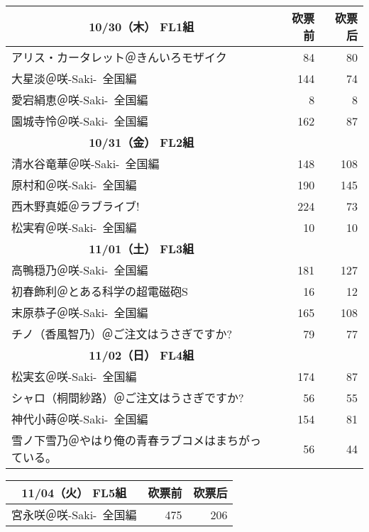 \documentclass[UTF8, punct=kaiming, zihao=-4]{ctexbook}
\newcommand{\kai}{\kaie\CJKfamily{kaiti}}
\newcommand{\mincho}{\minchoe\CJKfamily{mincho}}
\newcommand{\Saki}{咲-Saki-~全国編}
\newcommand{\Railgan}{とある科学の超電磁砲$\!$S}
\begin{document}
{\mincho{}
\begin{longtable}{|l|r|r|}\hline\hline
\multicolumn{1}{|c|}{\bf 10/30（木） FL1組}                      & \kai 砍票前 & \kai 砍票后 \\\hline
アリス・カータレット＠きんいろモザイク                & 84  & 80  \\\hline
大星淡＠\Saki                    & 144 & 74  \\\hline
愛宕絹恵＠\Saki                   & 8   & 8   \\\hline
園城寺怜＠\Saki                   & 162 & 87  \\\hline\hline
\multicolumn{1}{|c|}{\bf 10/31（金） FL2組}                      &     &     \\\hline
清水谷竜華＠\Saki                  & 148 & 108 \\\hline
原村和＠\Saki                    & 190 & 145 \\\hline
西木野真姫＠ラブライブ!                       & 224 & 73  \\\hline
松実宥＠\Saki                    & 10  & 10  \\\hline\hline
\multicolumn{1}{|c|}{\bf 11/01（土） FL3組}                      &     &     \\\hline
高鴨穏乃＠\Saki                   & 181 & 127 \\\hline
初春飾利＠\Railgan                   & 16  & 12  \\\hline
末原恭子＠\Saki                   & 165 & 108 \\\hline
チノ（香風智乃）＠ご注文はうさぎですか?               & 79  & 77  \\\hline\hline
\multicolumn{1}{|c|}{\bf 11/02（日） FL4組}                      &     &     \\\hline
松実玄＠\Saki                    & 174 & 87  \\\hline
シャロ（桐間紗路）＠ご注文はうさぎですか?              & 56  & 55  \\\hline
神代小蒔＠\Saki                   & 154 & 81  \\\hline
雪ノ下雪乃＠やはり俺の青春ラブコメはまちがっている。         & 56  & 44  \\\hline\hline
\end{longtable}
\begin{longtable}{|l|r|r|}\hline\hline
\multicolumn{1}{|c|}{\bf 11/04（火） FL5組}                      & \kai 砍票前 & \kai 砍票后 \\\hline
宮永咲＠\Saki                    & 475 & 206 \\\hline

\end{longtable}}
\end{document}
